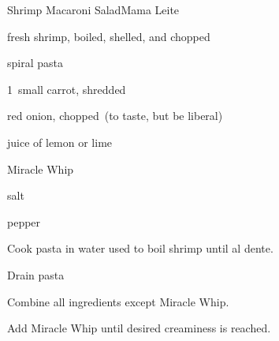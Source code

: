\begin{recipe}{Shrimp Macaroni Salad}{Mama Leite}{}

\begin{ingredients}
\item \lbs{\half} fresh shrimp, boiled, shelled, and chopped
\item {} spiral pasta
\item 1~small carrot, shredded
\item red onion, chopped~(to taste, but be liberal)
\item juice of \half{} lemon or lime
\item Miracle Whip
\item salt
\item pepper
\end{ingredients}

\begin{directions}
\item Cook pasta in water used to boil shrimp until al dente.
\item Drain pasta
\item Combine all ingredients except Miracle Whip.
\item Add Miracle Whip until desired creaminess is reached.
\end{directions}

\end{recipe}
